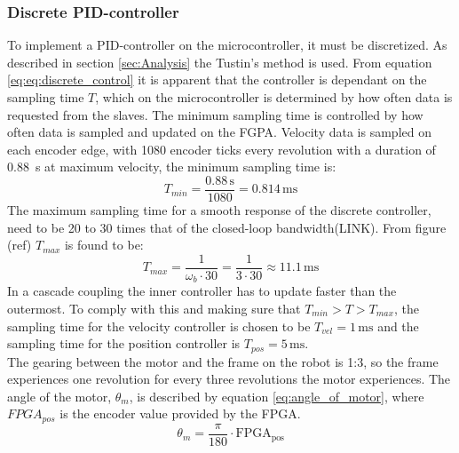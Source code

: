 \documentclass[../../main.tex]{subfiles}
\begin{document}
\subsubsection*{Discrete PID-controller}
To implement a PID-controller on the microcontroller, it must be discretized. As described in section \ref{sec:Analysis} the Tustin's method is used.
From equation \ref{eq:eq:discrete_control} it is apparent that the controller is dependant on the sampling time $T$, which on the microcontroller is determined by how often data is requested from the slaves. The minimum sampling time is controlled by how often data is sampled and updated on the FGPA. Velocity data is sampled on each encoder edge, with 1080 encoder ticks every revolution with a duration of \SI{0,88}{\second} \cite{} at maximum velocity, the minimum sampling time is:
\begin{equation}
    T_{min} = \frac{0.88\,\mathrm{s}}{1080} = 0.814\,\mathrm{ms}
\end{equation}
The maximum sampling time for a smooth response of the discrete controller, need to be 20 to 30 times that of the closed-loop bandwidth(LINK). From figure (ref) $T_{max}$ is found to be:
\begin{equation}
    T_{max} = \frac{1}{\omega_b\cdot 30} = \frac{1}{3 \cdot 30} \approx 11.1\,\mathrm{ms}
\end{equation}
In a cascade coupling the inner controller has to update faster than the outermost. To comply with this and making sure that $T_{min} > T > T_{max}$, the sampling time for the velocity controller is chosen to be $T_{vel} = 1\,\mathrm{ms}$ and the sampling time for the position controller is $T_{pos} = 5\,\mathrm{ms}$. \\


The gearing between the motor and the frame on the robot is 1:3, so the frame experiences one revolution for every three revolutions the motor experiences. The angle of the motor, $ \theta_{m} $, is described by equation \ref{eq:angle_of_motor}, where $FPGA_{pos}$ is the encoder value provided by the FPGA.
\begin{equation}\label{eq:angle_of_motor}
     \theta_{m} = \frac{\pi}{180} \cdot \mathrm{FPGA_{pos}}
\end{equation}
\end{document}
